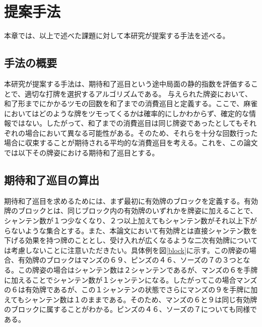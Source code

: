 \chapter{提案手法}
\label{chap:approach}

本章では、以上で述べた課題に対して本研究が提案する手法を述べる。

\section{手法の概要}
本研究が提案する手法は、期待和了巡目という途中局面の静的指数を評価することで、適切な打牌を選択するアルゴリズムである。
与えられた牌姿において、和了形までにかかるツモの回数を和了までの消費巡目と定義する。ここで、麻雀においてはどのような牌をツモってくるかは確率的にしかわからず、確定的な情報ではない。したがって、和了までの消費巡目は同じ牌姿であったとしてもそれぞれの場合において異なる可能性がある。そのため、それらを十分な回数行った場合に収束することが期待される平均的な消費巡目を考える。これを、この論文では以下その牌姿における期待和了巡目とする。


\section{期待和了巡目の算出}


期待和了巡目を求めるためには、まず最初に有効牌のブロックを定義する。有効牌のブロックとは、同じブロック内の有効牌のいずれかを牌姿に加えることで、シャンテン数が１つ少なくなり、２つ以上加えてもシャンテン数がそれ以上下がらないような集合とする。また、本論文において有効牌とは直接シャンテン数を下げる効果を持つ牌のこととし、受け入れが広くなるような二次有効牌については考慮しないことに注意いただきたい。具体例を図\ref{block}に示す。この牌姿の場合、有効牌のブロックはマンズの６９、ピンズの４６、ソーズの７の３つとなる。この牌姿の場合はシャンテン数は２シャンテンであるが、マンズの６を手牌に加えることでシャンテン数が１シャンテンになる。したがってこの場合マンズの６は有効牌であるが、この１シャンテンの状態でさらにマンズの９を手牌に加えてもシャンテン数は１のままである。そのため、マンズの６と９は同じ有効牌のブロックに属することがわかる。ピンズの４６、ソーズの７についても同様である。

